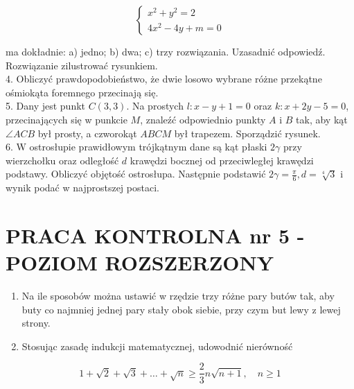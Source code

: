 \documentclass[10pt]{article}
\begin{document}
$$
\left\{\begin{array}{l}
x^{2}+y^{2}=2 \\
4 x^{2}-4 y+m=0
\end{array}\right.
$$

ma dokładnie: a) jedno; b) dwa; c) trzy rozwiązania. Uzasadnić odpowiedź. Rozwiązanie zilustrować rysunkiem.\\
4. Obliczyć prawdopodobieństwo, że dwie losowo wybrane różne przekątne ośmiokąta foremnego przecinają się.\\
5. Dany jest punkt $C(3,3)$. Na prostych $l: x-y+1=0$ oraz $k: x+2 y-5=0$, przecinających się w punkcie $M$, znaleźć odpowiednio punkty $A$ i $B$ tak, aby kąt $\angle A C B$ był prosty, a czworokąt $A B C M$ był trapezem. Sporządzić rysunek.\\
6. W ostrosłupie prawidłowym trójkątnym dane są kąt płaski $2 \gamma$ przy wierzchołku oraz odległość $d$ krawędzi bocznej od przeciwległej krawędzi podstawy. Obliczyć objętość ostrosłupa. Następnie podstawić $2 \gamma=\frac{\pi}{6}, d=\sqrt[4]{3}$ i wynik podać w najprostszej postaci.

\section*{PRACA KONTROLNA nr 5 - POZIOM ROZSZERZONY}
\begin{enumerate}
  \item Na ile sposobów można ustawić w rzędzie trzy różne pary butów tak, aby buty co najmniej jednej pary stały obok siebie, przy czym but lewy z lewej strony.
  \item Stosując zasadę indukcji matematycznej, udowodnić nierówność
\end{enumerate}

$$
1+\sqrt{2}+\sqrt{3}+\ldots+\sqrt{n} \geqslant \frac{2}{3} n \sqrt{n+1}, \quad n \geqslant 1
$$
\end{document}

